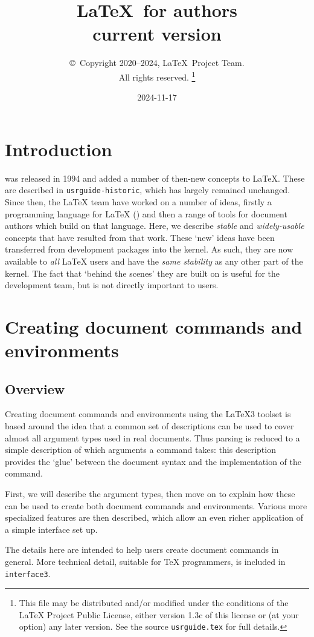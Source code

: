 \documentclass{ltxguide}
\title{\LaTeX\ for authors\\ current version}
\author{\copyright~Copyright 2020--2024, \LaTeX\ Project Team.\\
   All rights reserved.%
   \footnote{This file may be distributed and/or modified under the
     conditions of the \LaTeX{} Project Public License, either version 1.3c
     of this license or (at your option) any later version. See the source
    \texttt{usrguide.tex} for full details.}%
}
\date{2024-11-17}
\begin{document}
\maketitle

\tableofcontents

\section{Introduction}

\LaTeXe{} was released in 1994 and added a number of then-new concepts to
\LaTeX{}. These are described in \texttt{usrguide-historic}, which has largely remained
unchanged. Since then, the \LaTeX{} team have worked on a number of ideas,
firstly a programming language for \LaTeX{} () and then a range of
tools for document authors which build on that language. Here, we describe
\emph{stable} and \emph{widely-usable} concepts that have resulted from that
work. These `new' ideas have been transferred from development packages
into the \LaTeXe{} kernel. As such, they are now available to \emph{all}
\LaTeX{} users and have the \emph{same stability} as any other part of the
kernel. The fact that `behind the scenes' they are built on 
is useful for the development team, but is not directly important to users.

\section{Creating document commands and environments}

\subsection{Overview}

Creating document commands and environments using the \LaTeX3 toolset is based
around the idea that a common set of descriptions can be used to cover almost
all argument types used in real documents. Thus parsing is reduced to a simple
description of which arguments a command takes: this description provides the
`glue' between the document syntax and the implementation of the
command.

First, we will describe the argument types, then move on to explain how these
can be used to create both document commands and environments. Various more
specialized features are then described, which allow an even richer application
of a simple interface set up.

The details here are intended to help users create document commands in
general. More technical detail, suitable for \TeX{} programmers, is included
in \texttt{interface3}.
\end{document}
